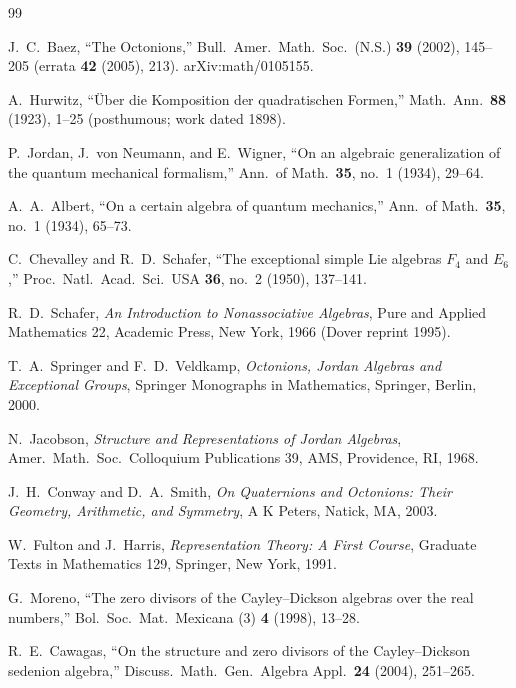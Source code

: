 \documentclass[aps,prresearch,onecolumn,amsmath,amssymb,nofootinbib]{revtex4-2}
\theoremstyle{plain}\newtheorem{theorem}{Theorem}[section]\newtheorem{proposition}[theorem]{Proposition}\newtheorem{lemma}[theorem]{Lemma}\newtheorem{corollary}[theorem]{Corollary}
\theoremstyle{definition}\newtheorem{definition}[theorem]{Definition}\newtheorem{conjecture}[theorem]{Conjecture}
\theoremstyle{remark}\newtheorem{remark}[theorem]{Remark}
\begin{document}
\begin{thebibliography}{99}

 J.~C.~Baez, ``The Octonions,'' Bull.\ Amer.\ Math.\ Soc.\ (N.S.) \textbf{39} (2002), 145--205 (errata \textbf{42} (2005), 213). arXiv:math/0105155.

 A.~Hurwitz, ``\"Uber die Komposition der quadratischen Formen,'' Math.\ Ann.\ \textbf{88} (1923), 1--25 (posthumous; work dated 1898).

 P.~Jordan, J.~von Neumann, and E.~Wigner, ``On an algebraic generalization of the quantum mechanical formalism,'' Ann.\ of Math.\ \textbf{35}, no.~1 (1934), 29--64.

 A.~A.~Albert, ``On a certain algebra of quantum mechanics,'' Ann.\ of Math.\ \textbf{35}, no.~1 (1934), 65--73.

 C.~Chevalley and R.~D.~Schafer, ``The exceptional simple Lie algebras $F_4$ and $E_6$,'' Proc.\ Natl.\ Acad.\ Sci.\ USA \textbf{36}, no.~2 (1950), 137--141.

 R.~D.~Schafer, \emph{An Introduction to Nonassociative Algebras}, Pure and Applied Mathematics 22, Academic Press, New York, 1966 (Dover reprint 1995).

 T.~A.~Springer and F.~D.~Veldkamp, \emph{Octonions, Jordan Algebras and Exceptional Groups}, Springer Monographs in Mathematics, Springer, Berlin, 2000.

 N.~Jacobson, \emph{Structure and Representations of Jordan Algebras}, Amer.\ Math.\ Soc.\ Colloquium Publications 39, AMS, Providence, RI, 1968.

 J.~H.~Conway and D.~A.~Smith, \emph{On Quaternions and Octonions: Their Geometry, Arithmetic, and Symmetry}, A K Peters, Natick, MA, 2003.

 W.~Fulton and J.~Harris, \emph{Representation Theory: A First Course}, Graduate Texts in Mathematics 129, Springer, New York, 1991.

 G.~Moreno, ``The zero divisors of the Cayley--Dickson algebras over the real numbers,'' Bol.\ Soc.\ Mat.\ Mexicana (3) \textbf{4} (1998), 13--28.

 R.~E.~Cawagas, ``On the structure and zero divisors of the Cayley--Dickson sedenion algebra,'' Discuss.\ Math.\ Gen.\ Algebra Appl.\ \textbf{24} (2004), 251--265.


\end{thebibliography}
\end{document}
